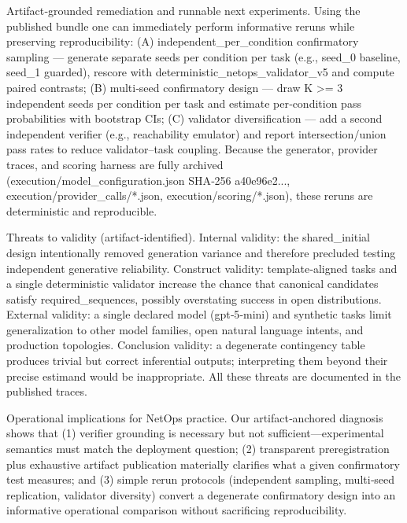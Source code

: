 \documentclass[conference]{IEEEtran}
\begin{document}
Artifact‑grounded remediation and runnable next experiments. Using the published bundle one can immediately perform informative reruns while preserving reproducibility: (A) independent\_per\_condition confirmatory sampling --- generate separate seeds per condition per task (e.g., seed\_0 baseline, seed\_1 guarded), rescore with deterministic\_netops\_validator\_v5 and compute paired contrasts; (B) multi‑seed confirmatory design --- draw K >= 3 independent seeds per condition per task and estimate per‑condition pass probabilities with bootstrap CIs; (C) validator diversification --- add a second independent verifier (e.g., reachability emulator) and report intersection/union pass rates to reduce validator--task coupling. Because the generator, provider traces, and scoring harness are fully archived (execution/model\_configuration.json SHA‑256 a40e96e2..., execution/provider\_calls/*.json, execution/scoring/*.json), these reruns are deterministic and reproducible.

Threats to validity (artifact‑identified). Internal validity: the shared\_initial design intentionally removed generation variance and therefore precluded testing independent generative reliability. Construct validity: template‑aligned tasks and a single deterministic validator increase the chance that canonical candidates satisfy required\_sequences, possibly overstating success in open distributions. External validity: a single declared model (gpt‑5‑mini) and synthetic tasks limit generalization to other model families, open natural language intents, and production topologies. Conclusion validity: a degenerate contingency table produces trivial but correct inferential outputs; interpreting them beyond their precise estimand would be inappropriate. All these threats are documented in the published traces.

Operational implications for NetOps practice. Our artifact‑anchored diagnosis shows that (1) verifier grounding is necessary but not sufficient---experimental semantics must match the deployment question; (2) transparent preregistration plus exhaustive artifact publication materially clarifies what a given confirmatory test measures; and (3) simple rerun protocols (independent sampling, multi‑seed replication, validator diversity) convert a degenerate confirmatory design into an informative operational comparison without sacrificing reproducibility.
\end{document}
